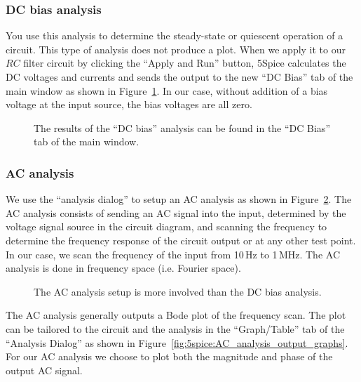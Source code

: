 \documentclass{article}
\begin{document}
\subsubsection{DC bias analysis}
You use this analysis to determine the steady-state or quiescent operation of a circuit. This type of analysis does not produce a plot. When we apply it to our $RC$ filter circuit by clicking the ``Apply and Run'' button, 5Spice calculates the DC voltages and currents and sends the output to the new ``DC Bias'' tab of the main window as shown in Figure~\ref{fig:5spice:DC_bias}.  In our case, without addition of a bias voltage at the input source, the bias voltages are all zero.

\begin{figure}
\begin{center}
\end{center}
\caption{The results of the ``DC bias'' analysis can be found in the ``DC Bias'' tab of the main window.}
\label{fig:5spice:DC_bias}
\end{figure}

\subsubsection{AC analysis}
We use the ``analysis dialog'' to setup an AC analysis as shown in Figure~\ref{fig:5spice:AC_analysis}. The AC analysis consists of sending an AC signal into the input, determined by the voltage signal source in the circuit diagram, and scanning the frequency to determine the frequency response of the circuit output or at any other test point. In our case, we scan the frequency of the input from 10\,Hz to 1\,MHz. The AC analysis is done in frequency space (i.e. Fourier space).

\begin{figure}
\begin{center}
\end{center}
\caption{The AC analysis setup is more involved than the DC bias analysis.}
\label{fig:5spice:AC_analysis}
\end{figure}

The AC analysis generally outputs a Bode plot of the frequency scan. The plot can be tailored to the circuit and the analysis in the ``Graph/Table'' tab of the ``Analysis Dialog'' as shown in Figure~\ref{fig:5spice:AC_analysis_output_graphs}. For our AC analysis we choose to plot both the magnitude and phase of the output AC signal.
\end{document}
